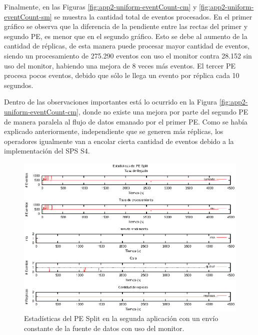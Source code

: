 Finalmente, en las Figuras \ref{fig:app2-uniform-eventCount-cm} y \ref{fig:app2-uniform-eventCount-sm} se muestra la cantidad total de eventos procesados. En el primer gráfico se observa que la diferencia de la pendiente entre las rectas del primer y segundo PE, es menor que en el segundo gráfico. Esto se debe al aumento de la cantidad de réplicas, de esta manera puede procesar mayor cantidad de eventos, siendo un procesamiento de 275.290 eventos con uso el monitor contra 28.152 sin uso del monitor, habiendo una mejora de 8 veces más eventos. El tercer PE procesa pocos eventos, debido que sólo le llega un evento por réplica cada 10 segundos.

Dentro de las observaciones importantes está lo ocurrido en la Figura \ref{fig:app2-uniform-eventCount-cm}, donde no existe una mejora por parte del segundo PE de manera paralela al flujo de datos emanado por el primer PE. Como se había explicado anteriormente, independiente que se generen más réplicas, los operadores igualmente van a encolar cierta cantidad de eventos debido a la implementación del SPS S4.

\begin{figure}[p]
\centering
    \includegraphics[scale=1.1]{images/exp/app2/uniform/cm/statusSplitPE.eps}
    \caption{Estadísticas del PE Split en la segunda aplicación con un envío constante de la fuente de datos con uso del monitor.}
    \label{fig:app2-uniform-statusSplitPE-cm}
\end{figure}

